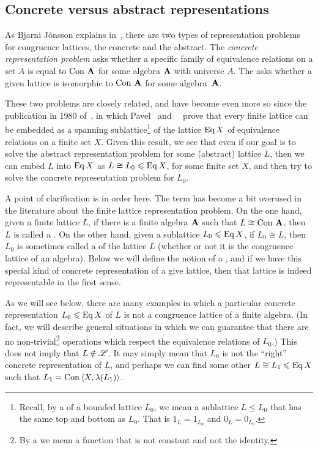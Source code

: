 \subsection{Concrete versus abstract representations}
As Bjarni J\'onsson explains in~\cite{Jonsson:1972}, there are two types of
representation problems for congruence lattices, the concrete and the
abstract.  The \emph{concrete representation problem} asks whether a specific family of
equivalence relations on a set $A$ is equal to $\operatorname{Con\,} \mathbf{A}$ for some
algebra $\mathbf{A}$ with universe $A$.  The 
asks whether a given lattice is isomorphic to $\operatorname{Con\,} \mathbf{A}$ for some algebra~$\mathbf{A}$.

These two problems are closely related, and have become even more so since the
publication in 1980 
of~\cite{Pudlak:1980}, in which Pavel \Pudlak\ and
\Jiri\ \Tuma\ prove that every finite
lattice can be embedded as a 
spanning sublattice\footnote{Recall, by a 
  of a bounded lattice $L_0$, we mean a sublattice $L\leq L_0$ that has the same top and
  bottom as $L_0$.  That is  $1_L = 1_{L_0}$ and $0_L = 0_{L_0}$.}
of the lattice $\operatorname{Eq} X$ of equivalence relations on a finite set $X$.   
Given this result, we see that even if our goal is to solve the abstract
representation problem for some (abstract) lattice $L$, then
we can embed $L$ into $\operatorname{Eq} X$ as $L\cong L_0\leqslant \operatorname{Eq} X$, for some finite set
$X$, and then try to solve the concrete representation problem for $L_0$.  

A point of clarification is in order here.  The term 
has become a bit overused in the literature about the finite lattice
representation problem.  On the one hand, given a finite lattice $L$, if there
is a finite algebra $\mathbf{A}$ such that $L \cong \operatorname{Con\,} \mathbf{A}$, then $L$ is called a
.  On the other hand, given a sublattice $L_0\leqslant \operatorname{Eq} X$, 
if $L_0\cong L$, then $L_0$ is sometimes called a 
of the lattice $L$ (whether or not it is the congruence lattice of an algebra).    
Below we will define the notion of a , and if we
have this special kind of concrete representation of a give lattice, then that
lattice is indeed representable in the first sense.

As we will see below, there are many examples in which a particular concrete
representation $L_0\leqslant \operatorname{Eq} X$ of $L$ is not a congruence lattice of a
finite algebra.  (In fact, we will describe general situations in which we can
guarantee that there are no non-trivial\footnote{By a 
   we mean a function that is
  not constant and not the identity.} operations which respect the equivalence
relations of $L_0$.)  This does not imply that $L \notin \mathscr{L}$.  It may
simply mean that $L_0$ is not the ``right'' concrete representation of $L$, and
perhaps we can find some other $L \cong L_1\leqslant \operatorname{Eq} X$ such that $L_1 = \operatorname{Con\,}
\langle X, \lambda(L_1)\rangle$.

